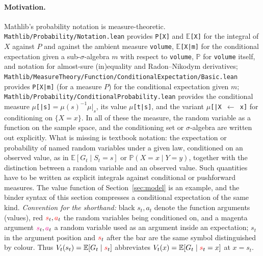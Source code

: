 \documentclass[11pt,a4paper]{article}
\newcommand{\E}{\mathbb{E}}
\newcommand{\Prb}{\mathbb{P}}
\newcommand{\rv}[1]{{\color{red}#1}}       %
\newcommand{\ra}[1]{{\color{magenta}#1}}   %
\newcommand{\sv}{\rv{s}}
\newcommand{\av}{\rv{a}}
\begin{document}
\paragraph{Motivation.}
Mathlib's probability notation is measure-theoretic.
\nolinkurl{Mathlib/Probability/Notation.lean} provides \texttt{P[X]} and \texttt{$\mathbb{E}$[X]} for the integral of $X$ against $P$ and against the ambient measure \texttt{volume}, \texttt{$\mathbb{E}$[X|m]} for the conditional expectation given a sub-$\sigma$-algebra $m$ with respect to \texttt{volume}, \texttt{$\mathbb{P}$} for \texttt{volume} itself, and notation for almost-sure (in)equality and Radon--Nikodym derivatives; \nolinkurl{Mathlib/MeasureTheory/Function/ConditionalExpectation/Basic.lean} provides \texttt{P[X|m]} (for a measure $P$) for the conditional expectation given $m$; \nolinkurl{Mathlib/Probability/ConditionalProbability.lean} provides the conditional measure \texttt{$\mu$[|s]}${}=\mu(s)^{-1}\mu|_s$, its value \texttt{$\mu$[t|s]}, and the variant \texttt{$\mu$[|X $\leftarrow$ x]} for conditioning on $\{X=x\}$.
In all of these the measure, the random variable as a function on the sample space, and the conditioning set or $\sigma$-algebra are written out explicitly.
What is missing is textbook notation: the expectation or probability of named random variables under a given law, conditioned on an observed value, as in $\E[G_t\mid S_t=s]$ or $\Prb(X=x\mid Y=y)$, together with the distinction between a random variable and an observed value.
Such quantities have to be written as explicit integrals against conditional or pushforward measures.
The value function of Section~\ref{sec:model} is an example, and the binder syntax of this section compresses a conditional expectation of the same kind.
\emph{Convention for the shorthand:} black $s_t,a_t$ denote the function arguments (values), red $\sv_t,\av_t$ the random variables being conditioned on, and a magenta argument $\ra{s}_t,\ra{a}_t$ a random variable used as an argument inside an expectation; $s_t$ in the argument position and $\sv_t$ after the bar are the same symbol distinguished by colour.
Thus $V_t(s_t)=\E[G_t\mid\sv_t]$ abbreviates $V_t(x)=\E[G_t\mid\sv_t=x]$ at $x=s_t$.
\end{document}
